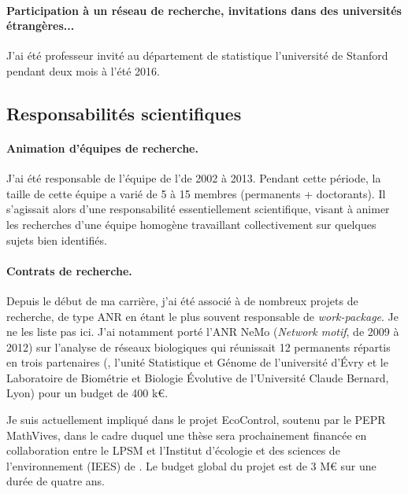 \paragraph{Participation à un réseau de recherche, invitations dans des universités étrangères...}
J'ai été professeur invité au département de statistique l'université de Stanford pendant deux mois à l'été 2016.

\subsection{Responsabilités scientifiques}

\paragraph{Animation d’équipes de recherche.}
J’ai été responsable de l’équipe \SG de l’\UMRlong de 2002 à 2013. Pendant cette période, la taille de cette équipe a varié de 5 à 15 membres (permanents + doctorants). Il s'agissait alors d'une responsabilité essentiellement scientifique, visant à animer les recherches d'une équipe homogène travaillant collectivement sur quelques sujets bien identifiés.

\paragraph{Contrats de recherche.}
Depuis le début de ma carrière, j’ai été associé à de nombreux projets de recherche, de type  ANR en étant le plus souvent responsable de {\sl work-package}. Je ne les liste pas ici. J’ai notamment porté l’ANR NeMo ({\sl Network motif}, de 2009 à 2012) sur l’analyse de réseaux biologiques qui réunissait 12 permanents répartis en trois partenaires (\UMRcourt, l’unité Statistique et Génome de l’université d’Évry et le Laboratoire de Biométrie et Biologie Évolutive de l’Université Claude Bernard, Lyon) pour un budget de 400 k\euro.

Je suis actuellement impliqué dans le projet EcoControl, soutenu par le PEPR MathVives, dans le cadre duquel une thèse sera prochainement financée en collaboration entre le LPSM et l’Institut d'écologie et des sciences de l'environnement (IEES) de \SU. Le budget global du projet est de 3 M\euro\xspace sur une durée de quatre ans.

